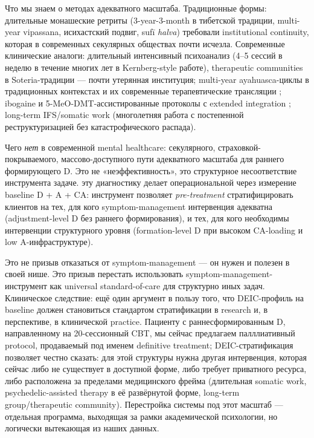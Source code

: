 Что мы знаем о методах адекватного масштаба. Традиционные формы: длительные монашеские ретриты (3-year-3-month в тибетской традиции, multi-year vipassana, исихастский подвиг, suf\=i \textit{halva}) требовали institutional continuity, которая в современных секулярных обществах почти исчезла. Современные клинические аналоги: длительный интенсивный психоанализ (4--5 сессий в неделю в течение многих лет в Kernberg-style работе), therapeutic communities в Soteria-традиции \citep{mosher1999} --- почти утерянная институция; multi-year ayahuasca-циклы в традиционных контекстах и их современные терапевтические трансляции \citep[см.][в ceremonial framework]{nielson2018}; ibogaine и 5-MeO-DMT-ассистированные протоколы с extended integration \citep[в Мексике/Нидерландах, см. обзор][]{brown2019}; long-term IFS/somatic work (многолетняя работа с постепенной реструктуризацией без катастрофического распада).

Чего \emph{нет} в современной mental healthcare: секулярного, страховкой-покрываемого, массово-доступного пути адекватного масштаба для раннего формирующего D. Это не «неэффективность», это структурное несоответствие инструмента задаче. \DEIC{} эту диагностику делает операциональной через измерение baseline D + A + CA: инструмент позволяет \emph{pre-treatment} стратифицировать клиентов на тех, для кого symptom-management интервенция адекватна (adjustment-level D без раннего формирования), и тех, для кого необходимы интервенции структурного уровня (formation-level D при высоком CA-loading и low A-инфраструктуре).

Это не призыв отказаться от symptom-management --- он нужен и полезен в своей нише. Это призыв перестать использовать symptom-management-инструмент как universal standard-of-care для структурно иных задач. Клиническое следствие: ещё один аргумент в пользу того, что DEIC-профиль на baseline должен становиться стандартом стратификации в research и, в перспективе, в клинической practice. Пациенту с раннесформированным D, направленному на 20-сессионный CBT, мы сейчас предлагаем палллиативный protocol, продаваемый под именем definitive treatment; DEIC-стратификация позволяет честно сказать: для этой структуры нужна другая интервенция, которая сейчас либо не существует в доступной форме, либо требует приватного ресурса, либо расположена за пределами медицинского фрейма (длительная somatic work, psychedelic-assisted therapy в её развёрнутой форме, long-term group/therapeutic community). Перестройка системы под этот масштаб --- отдельная программа, выходящая за рамки академической психологии, но логически вытекающая из наших данных.


